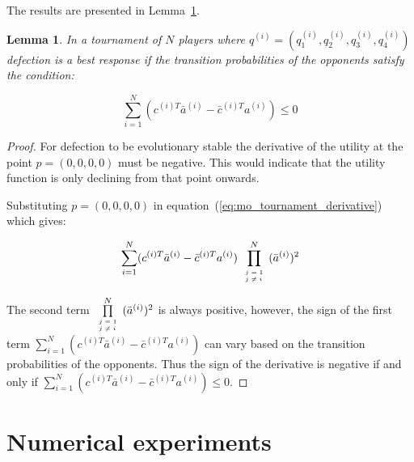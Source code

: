\documentclass[10pt]{article}
\newtheorem{lemma}[theorem]{Lemma}
\begin{document}
The results are presented in Lemma~\ref{lemma:stability_of_defection}.

\begin{lemma}\label{lemma:stability_of_defection}
    In a tournament of \(N\) players where \(q^{(i)} = (q_{1}^{(i)}, q_{2}^{(i)}, q_{3}^{(i)}, q_{4}^{(i)})\)
    defection is a best response if the transition probabilities of the
    opponents satisfy the condition:

    \begin{equation}
        \sum_{i=1} ^ N (c^{(i)T} \bar{a}^{(i)} - \bar{c}^{(i)T} a^{(i)}) \leq 0
    \end{equation}
\end{lemma}

\begin{proof}
    For defection to be evolutionary stable the derivative of the utility
    at the point \(p = (0, 0, 0, 0)\) must be negative. This would indicate that
    the utility function is only declining from that point onwards.

    Substituting \(p = (0, 0, 0, 0)\) in
    equation~(\ref{eq:mo_tournament_derivative}) which gives:

    \begin{equation}
    \sum_{i=1} ^ N (c^{(i)T} \bar{a}^{(i)} - \bar{c}^{(i)T} a^{(i)})
    \prod\limits_{\tiny\begin{array}{l} j=1 \\ j \neq i \end{array}} ^ N (\bar{a}^{(i)})^2
    \end{equation}
    
    The second term \(\prod\limits_{\tiny\begin{array}{l} j=1 \\ j \neq i
    \end{array}} ^ N (\bar{a}^{(i)})^2\) is always positive, however, the sign of the
    first term \(\sum_{i=1} ^ N (c^{(i)T} \bar{a}^{(i)} - \bar{c}^{(i)T} a^{(i)})\)
    can vary based on the transition probabilities of the opponents. Thus the
    sign of the derivative is negative if and only if
    \(\sum_{i=1} ^ N (c^{(i)T} \bar{a}^{(i)} - \bar{c}^{(i)T} a^{(i)}) \leq 0\).
\end{proof}

\section{Numerical experiments} \label{section:numerical_experiments}
\end{document}
